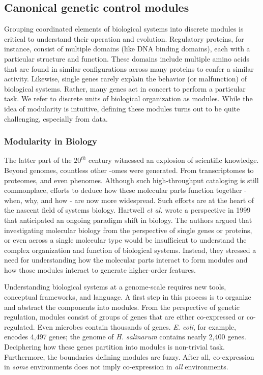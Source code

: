 \subsection{Canonical genetic control modules}

Grouping coordinated elements of biological systems into discrete modules is critical to understand their operation and evolution. Regulatory proteins, for instance, consist of multiple domains (like DNA binding domains), each with a particular structure and function. These domains include multiple amino acids that are found in similar configurations across many proteins to confer a similar activity. Likewise, single genes rarely explain the behavior (or malfunction) of biological systems. Rather, many genes act in concert to perform a particular task. We refer to discrete units of biological organization as modules. While the idea of modularity is intuitive, defining these modules turns out to be quite challenging, especially from data. 

\subsubsection{Modularity in Biology}

The latter part of the $20^{th}$ century witnessed an explosion of scientific knowledge. Beyond genomes, countless other -omes were generated. From transcriptomes to proteomes, and even phenomes. Although such high-throughput cataloging is still commonplace, efforts to deduce how these molecular parts function together - when, why, and how - are now more widespread. Such efforts are at the heart of the nascent field of systems biology. Hartwell \textit{et al.} wrote a perspective in 1999 \cite{hartwell_molecular_1999} that anticipated an ongoing paradigm shift in biology. The authors argued that investigating molecular biology from the perspective of single genes or proteins, or even across a single molecular type would be insufficient to understand the complex organization and function of biological systems. Instead, they  stressed a need for understanding how the molecular parts interact to form modules and how those modules interact to generate higher-order features.

Understanding biological systems at a genome-scale requires new tools, conceptual frameworks, and language. A first step in this process is to organize and abstract the components into modules. From the perspective of genetic regulation, modules consist of groups of genes that are either co-expressed or co-regulated. Even microbes contain thousands of genes. \textit{E. coli}, for example, encodes 4,497 genes; the genome of \textit{H. salinarum} contains nearly 2,400 genes. Deciphering how these genes partition into modules is non-trivial task. Furthermore, the boundaries defining modules are fuzzy. After all, co-expression in \textit{some} environments does not imply co-expression in \textit{all} environments.

